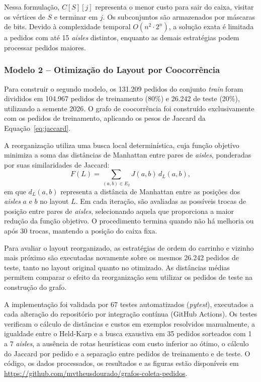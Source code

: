 Nessa formulação, $C[S][j]$ representa o menor custo para sair do caixa, visitar os vértices de $S$ e terminar em $j$. Os subconjuntos são armazenados por máscaras de bits. Devido à complexidade temporal $O(n^2 \cdot 2^n)$, a solução exata é limitada a pedidos com até 15 \textit{aisles} distintos, enquanto as demais estratégias podem processar pedidos maiores.

\subsubsection*{Modelo 2 -- Otimização do Layout por Coocorrência}

Para construir o segundo modelo, os 131.209 pedidos do conjunto \textit{train} foram divididos em 104.967 pedidos de treinamento (80\%) e 26.242 de teste (20\%), utilizando a semente 2026. O grafo de coocorrência foi construído exclusivamente com os pedidos de treinamento, aplicando os pesos de Jaccard da Equação~\ref{eq:jaccard}.

A reorganização utiliza uma busca local determinística, cuja função objetivo minimiza a soma das distâncias de Manhattan entre pares de \textit{aisles}, ponderadas por suas similaridades de Jaccard:
\begin{equation}
F(L) = \sum_{(a,b) \in E_2} J(a,b)\, d_L(a,b),
\label{eq:objetivo}
\end{equation}
em que $d_L(a,b)$ representa a distância de Manhattan entre as posições dos \textit{aisles} $a$ e $b$ no layout $L$. Em cada iteração, são avaliadas as possíveis trocas de posição entre pares de \textit{aisles}, selecionando aquela que proporciona a maior redução da função objetivo. O procedimento termina quando não há melhoria ou após 30 trocas, mantendo a posição do caixa fixa.

Para avaliar o layout reorganizado, as estratégias de ordem do carrinho e vizinho mais próximo são executadas novamente sobre os mesmos 26.242 pedidos de teste, tanto no layout original quanto no otimizado. As distâncias médias permitem comparar o efeito da reorganização sem utilizar os pedidos de teste na construção do grafo.

A implementação foi validada por 67 testes automatizados (\textit{pytest}), executados a cada alteração do repositório por integração contínua (GitHub Actions). Os testes verificam o cálculo de distâncias e custos em exemplos resolvidos manualmente, a igualdade entre o Held-Karp e a busca exaustiva em 35 pedidos sorteados com 1 a 7 \textit{aisles}, a ausência de rotas heurísticas com custo inferior ao ótimo, o cálculo do Jaccard por pedido e a separação entre pedidos de treinamento e de teste. O código, os dados processados, os resultados e as figuras estão disponíveis em \url{https://github.com/mvtheusdourado/grafos-coleta-pedidos}.

